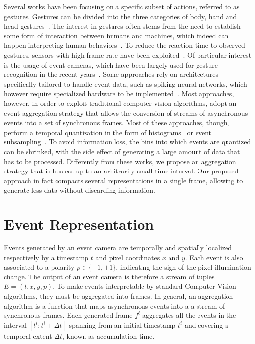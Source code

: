 \documentclass[a4paper,conference]{IEEEtran}
\begin{document}
Several works have been focusing on a specific subset of actions, referred to as gestures. Gestures can be divided into the three categories of body, hand and head gestures~\cite{mitra2007gesture}. The interest in gestures often stems from the need to establish some form of interaction between humans and machines, which indeed can happen interpreting human behaviors~\cite{liu2018gesture}. To reduce the reaction time to observed gestures, sensors with high frame-rate have been exploited~\cite{sato2006ohajiki}. Of particular interest is the usage of event cameras, which have been largely used for gesture recognition in the recent years~\cite{maro2020event, kaiser2019embodied, shrestha2018slayer, amir2017low, wang2019space, kaiser2020synaptic, ghosh2019spatiotemporal, bi2019graph}.
Some approaches rely on architectures specifically tailored to handle event data, such as spiking neural networks, which however require specialized hardware to be implemented~\cite{o2013real, kaiser2020synaptic, shrestha2018slayer}.
Most approaches, however, in order to exploit traditional computer vision algorithms, adopt an event aggregation strategy that allows the conversion of streams of asynchronous events into a set of synchronous frames. Most of these approaches, though, perform a temporal quantization in the form of histograms~\cite{ghosh2019spatiotemporal} or event subsampling~\cite{kaiser2019embodied}. To avoid information loss, the bins into which events are quantized can be shrinked, with the side effect of generating a large amount of data that has to be processed. Differently from these works, we propose an aggregation strategy that is lossless up to an arbitrarily small time interval. Our proposed approach in fact compacts several representations in a single frame, allowing to generate less data without discarding information.



\section{Event Representation}
\label{sec:method}
Events generated by an event camera are temporally and spatially localized respectively by a timestamp $t$ and pixel coordinates $x$ and $y$. Each event is also associated to a polarity $p\in \{-1, +1\}$, indicating the sign of the pixel illumination change. The output of an event camera is therefore a stream of tuples $E=(t, x, y, p)$.
To make events interpretable by standard Computer Vision algorithms, they must be aggregated into frames. In general, an aggregation algorithm is a function that maps asynchronous events into a a stream of synchronous frames.
Each generated frame $f^i$ aggregates all the events in the interval $[t^i; t^i + \Delta t ]$ spanning from an initial timestamp $t^i$ and covering a temporal extent $\Delta t$, known as accumulation time.
\end{document}
